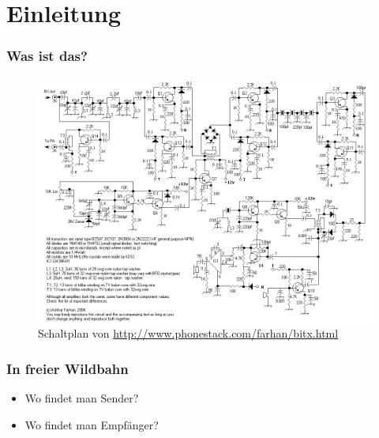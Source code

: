 

\subtitle{Technik 15: \\
  Sender- und Empfängertechnik \\[2em]}
\date{Stand 05.12.2016}


\section*{Einleitung}

\begin{frame}
  \frametitle{Was ist das?}
  \begin{center}
    \begin{figure}
      \includegraphics[width=.95\textwidth,height=.75\textheight,keepaspectratio]{e15/bitx.png}
      \caption{Schaltplan von \ExternalLink\url{http://www.phonestack.com/farhan/bitx.html}}
    \end{figure}
  \end{center}
\end{frame}

\begin{frame}
  \frametitle{In freier Wildbahn}
  \begin{itemize}
    \item Wo findet man Sender?
    \item Wo findet man Empfänger?
  \end{itemize}
\end{frame}

